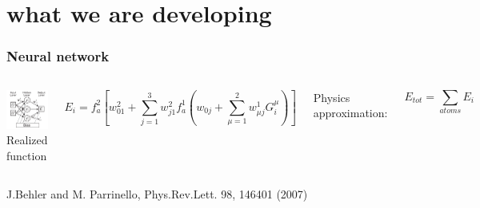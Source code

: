\documentclass[12pt,notes=off,unicode]{beamer}
\begin{document}
  \section{what we are developing} %
  \label{sec:what_we_are_developing}
    \begin{frame}[c]\frametitle{Neural network}
        
      \begin{columns}
        \includegraphics[width=\textwidth]{nn_parinello}
        Realized function
        \begin{tiny}
          \begin{equation*}
            E_i = f_a^2\left[w_{01}^2+\sum_{j=1}^3 w_{j1}^2f_a^1\left(w_{0j}+\sum_{\mu=1}^2w_{\mu j}^1 G_i^\mu\right)\right]
          \end{equation*}
        \end{tiny}
        Physics approximation:
        \begin{tiny}
          \begin{equation*}
            E_{tot} = \sum_{atoms} E_i
          \end{equation*}
        \end{tiny}
      \end{columns}
      \par\hfill \tiny J.Behler and M. Parrinello, Phys.Rev.Lett. 98, 146401 (2007)
    \end{frame}
\end{document}
